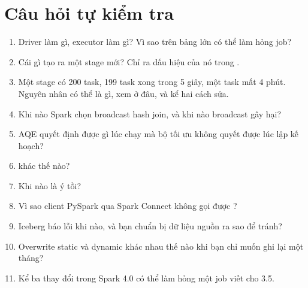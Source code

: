 \section{Câu hỏi tự kiểm tra}
\begin{enumerate}
  \item Driver làm gì, executor làm gì? Vì sao  trên bảng lớn có thể làm hỏng job?
  \item Cái gì tạo ra một stage mới? Chỉ ra dấu hiệu của nó trong .
  \item Một stage có 200 task, 199 task xong trong 5 giây, một task mất 4 phút. Nguyên nhân có thể là gì, xem ở đâu, và kể hai cách sửa.
  \item Khi nào Spark chọn broadcast hash join, và khi nào broadcast gây hại?
  \item AQE quyết định được gì lúc chạy mà bộ tối ưu không quyết được lúc lập kế hoạch?
  \item {} khác  thế nào?
  \item Khi nào  là ý tồi?
  \item Vì sao client PySpark qua Spark Connect không gọi được ?
  \item {} Iceberg báo lỗi khi nào, và bạn chuẩn bị dữ liệu nguồn ra sao để tránh?
  \item Overwrite static và dynamic khác nhau thế nào khi bạn chỉ muốn ghi lại một tháng?
  \item Kể ba thay đổi trong Spark 4.0 có thể làm hỏng một job viết cho 3.5.
\end{enumerate}

